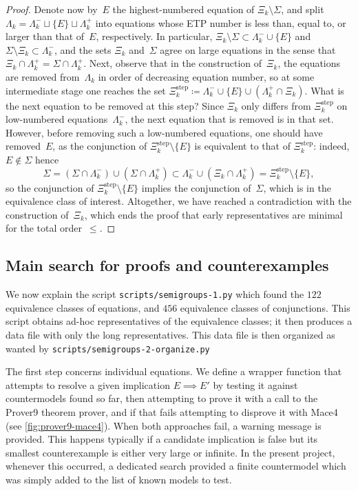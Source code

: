 \documentclass[12pt]{amsart}
\theoremstyle{plain}
\theoremstyle{definition}
\begin{document}
\begin{proof}
Denote now by~$E$ the highest-numbered equation of $\Xi_k\setminus\Sigma$, and split $\Lambda_k=\Lambda_k^-\sqcup\{E\}\sqcup\Lambda_k^+$ into equations whose ETP number is less than, equal to, or larger than that of~$E$, respectively.  In particular, $\Xi_k\setminus\Sigma\subset\Lambda_k^-\cup\{E\}$ and $\Sigma\setminus\Xi_k\subset\Lambda_k^-$, and the sets $\Xi_k$ and~$\Sigma$ agree on large equations in the sense that $\Xi_k\cap\Lambda_k^+=\Sigma\cap\Lambda_k^+$.
Next, observe that in the construction of~$\Xi_k$, the equations are removed from~$\Lambda_k$ in order of decreasing equation number, so at some intermediate stage one reaches the set $\Xi_k^{\text{step}}\coloneqq\Lambda_k^-\cup\{E\}\cup(\Lambda_k^+\cap\Xi_k)$.
What is the next equation to be removed at this step?
Since $\Xi_k$ only differs from $\Xi_k^{\text{step}}$ on low-numbered equations~$\Lambda_k^-$, the next equation that is removed is in that set.
However, before removing such a low-numbered equations, one should have removed~$E$, as the conjunction of $\Xi_k^{\text{step}}\setminus\{E\}$ is equivalent to that of $\Xi_k^{\text{step}}$: indeed, $E\not\in\Sigma$ hence
\begin{equation}
  \Sigma = (\Sigma\cap\Lambda_k^-)\cup(\Sigma\cap\Lambda_k^+)
  \subset \Lambda_k^- \cup (\Xi_k\cap\Lambda_k^+) = \Xi_k^{\text{step}}\setminus\{E\} ,
\end{equation}
so the conjunction of $\Xi_k^{\text{step}}\setminus\{E\}$ implies the conjunction of~$\Sigma$, which is in the equivalence class of interest.
Altogether, we have reached a contradiction with the construction of~$\Xi_k$, which ends the proof that early representatives are minimal for the total order~$\leq$.
\end{proof}




\subsection{Main search for proofs and counterexamples}
\label{subsec:main-search}

We now explain the script \texttt{scripts/semigroups-1.py} which found the $122$ equivalence classes of equations, and $456$ equivalence classes of conjunctions.
This script obtains ad-hoc representatives of the equivalence classes; it then produces a data file with only the long representatives.  This data file is then organized as wanted by \texttt{scripts/semigroups-2-organize.py}

The first step concerns individual equations.
We define a wrapper function that attempts to resolve a given implication $E\implies E'$ by testing it against countermodels found so far, then attempting to prove it with a call to the Prover9 theorem prover, and if that fails attempting to disprove it with Mace4 (see \autoref{fig:prover9-mace4}).
When both approaches fail, a warning message is provided.  This happens typically if a candidate implication is false but its smallest counterexample is either very large or infinite.  In the present project, whenever this occurred, a dedicated search provided a finite countermodel which was simply added to the list of known models to test.
\end{document}
